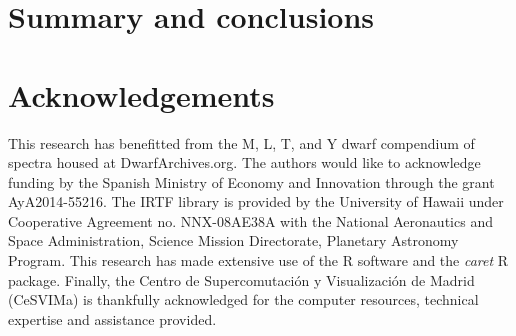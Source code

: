 \documentclass[a4paper,fleqn,usenatbib]{mnras}
\begin{document}
\section{Summary and conclusions}
\label{sec:summary}


\section*{Acknowledgements}
This research has benefitted from the M, L, T, and Y dwarf compendium
of spectra housed at DwarfArchives.org.  The authors would like to
acknowledge funding by the Spanish Ministry of Economy and Innovation
through the grant AyA2014-55216. The IRTF library is provided by the
University of Hawaii under Cooperative Agreement no. NNX-08AE38A with
the National Aeronautics and Space Administration, Science Mission
Directorate, Planetary Astronomy Program. This research has made
extensive use of the R software \cite{R} and the {\it caret} R
package. Finally, the Centro de Supercomutaci\'on y Visualizaci\'on 
de Madrid (CeSVIMa) is thankfully acknowledged for the computer
resources, technical expertise and assistance provided.


{}


\begin{appendix}
\label{app}



\end{appendix}
\end{document}
